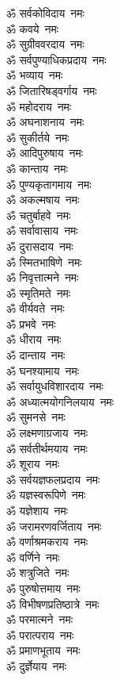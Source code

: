 \begin{multicols}{2}
\begin{flushleft}
ॐ सर्वकोविदाय~नमः\\
ॐ कवये~नमः\\
ॐ सुग्रीववरदाय~नमः\\
ॐ सर्वपुण्याधिकप्रदाय~नमः\\
ॐ भव्याय~नमः\\
ॐ जितारिषड्वर्गाय~नमः\\
ॐ महोदराय~नमः\hfill{}\\
ॐ अघनाशनाय~नमः\\
ॐ सुकीर्तये~नमः\\
ॐ आदिपुरुषाय~नमः\\
ॐ कान्ताय~नमः\\
ॐ पुण्यकृतागमाय~नमः\\
ॐ अकल्मषाय~नमः\\
ॐ चतुर्बाहवे~नमः\\
ॐ सर्वावासाय~नमः\\
ॐ दुरासदाय~नमः\\
ॐ स्मितभाषिणे~नमः\hfill{}\\
ॐ निवृत्तात्मने~नमः\\
ॐ स्मृतिमते~नमः\\
ॐ वीर्यवते~नमः\\
ॐ प्रभवे~नमः\\
ॐ धीराय~नमः\\
ॐ दान्ताय~नमः\\
ॐ घनश्यामाय~नमः\\
ॐ सर्वायुधविशारदाय~नमः\\
ॐ अध्यात्मयोगनिलयाय~नमः\\
ॐ सुमनसे~नमः\hfill{}\\
ॐ लक्ष्मणाग्रजाय~नमः\\
ॐ सर्वतीर्थमयाय~नमः\\
ॐ शूराय~नमः\\
ॐ सर्वयज्ञफलप्रदाय~नमः\\
ॐ यज्ञस्वरूपिणे~नमः\\
ॐ यज्ञेशाय~नमः\\
ॐ जरामरणवर्जिताय~नमः\\
ॐ वर्णाश्रमकराय~नमः\\
ॐ वर्णिने~नमः\\
ॐ शत्रुजिते~नमः\hfill{}\\
ॐ पुरुषोत्तमाय~नमः\\
ॐ विभीषणप्रतिष्ठात्रे~नमः\\
ॐ परमात्मने~नमः\\
ॐ परात्पराय~नमः\\
ॐ प्रमाणभूताय~नमः\\
ॐ दुर्ज्ञेयाय~नमः\\

\end{flushleft}
\end{multicols}
